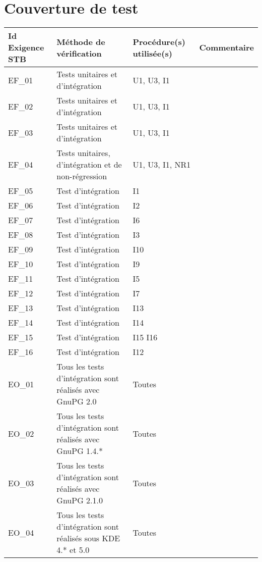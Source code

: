 \documentclass{../res/univ-projet}
\begin{document}
\section{Couverture de test}

\begin{center}
    \begin{tabular}{|p{2.8cm}|p{4.2cm}|p{3cm}|p{5cm}|}
      \hline
      Id Exigence STB & Méthode de vérification & Procédure(s) utilisée(s) & Commentaire\\ \hline
      EF\_01 & Tests unitaires et d'intégration & U1, U3, I1 & \\ \hline
      EF\_02 & Tests unitaires et d'intégration & U1, U3, I1 & \\ \hline
      EF\_03 & Tests unitaires et d'intégration & U1, U3, I1 & \\ \hline
      EF\_04 & Tests unitaires, d'intégration et de non-régression & U1, U3, I1, NR1 & \\ \hline
      EF\_05 & Test d'intégration & I1 & \\ \hline
      EF\_06 & Test d'intégration & I2 & \\ \hline
      EF\_07 & Test d'intégration & I6 & \\ \hline
      EF\_08 & Test d'intégration & I3 & \\ \hline
      EF\_09 & Test d'intégration & I10 & \\ \hline
      EF\_10 & Test d'intégration & I9 & \\ \hline
      EF\_11 & Test d'intégration & I5 & \\ \hline
      EF\_12 & Test d'intégration & I7 & \\ \hline
      EF\_13 & Test d'intégration & I13 & \\ \hline
      EF\_14 & Test d'intégration & I14 & \\ \hline
      EF\_15 & Test d'intégration & I15 I16 & \\ \hline
      EF\_16 & Test d'intégration & I12 & \\ \hline
      EO\_01 & Tous les tests d'intégration sont réalisés avec GnuPG 2.0 & Toutes & \\ \hline
      EO\_02 & Tous les tests d'intégration sont réalisés avec GnuPG 1.4.* & Toutes & \\ \hline
      EO\_03 & Tous les tests d'intégration sont réalisés avec GnuPG 2.1.0 & Toutes & \\ \hline
      EO\_04 & Tous les tests d'intégration sont réalisés sous KDE 4.* et 5.0 & Toutes & \\ \hline

\end{tabular}
\end{center}
\end{document}
